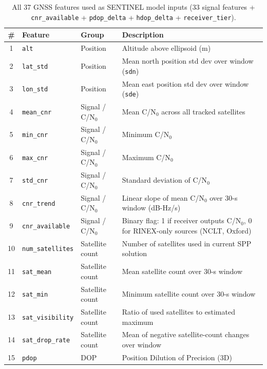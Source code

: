 \documentclass[12pt,a4paper]{article}
\newcommand{\code}[1]{\texttt{#1}}
\begin{document}
\begin{longtable}{cllp{4.5cm}}
  \caption{All 37 GNSS features used as SENTINEL model inputs (33 signal features + \code{cnr\_available} + \code{pdop\_delta} + \code{hdop\_delta} + \code{receiver\_tier}).} \\
  \toprule
  \textbf{\#} & \textbf{Feature} & \textbf{Group} & \textbf{Description} \\
  \midrule
  \endhead
  1  & \code{alt}                   & Position              & Altitude above ellipsoid (m) \\
  2  & \code{lat\_std}              & Position              & Mean north position std dev over window (\code{sdn}) \\
  3  & \code{lon\_std}              & Position              & Mean east position std dev over window (\code{sde}) \\
  4  & \code{mean\_cnr}             & Signal / C/N$_0$      & Mean C/N$_0$ across all tracked satellites \\
  5  & \code{min\_cnr}              & Signal / C/N$_0$      & Minimum C/N$_0$ \\
  6  & \code{max\_cnr}              & Signal / C/N$_0$      & Maximum C/N$_0$ \\
  7  & \code{std\_cnr}              & Signal / C/N$_0$      & Standard deviation of C/N$_0$ \\
  8  & \code{cnr\_trend}            & Signal / C/N$_0$      & Linear slope of mean C/N$_0$ over 30-s window (dB-Hz/s) \\
  9  & \code{cnr\_available}        & Signal / C/N$_0$      & Binary flag: 1 if receiver outputs C/N$_0$, 0 for RINEX-only sources (NCLT, Oxford) \\
  10 & \code{num\_satellites}       & Satellite count       & Number of satellites used in current SPP solution \\
  11 & \code{sat\_mean}             & Satellite count       & Mean satellite count over 30-s window \\
  12 & \code{sat\_min}              & Satellite count       & Minimum satellite count over 30-s window \\
  13 & \code{sat\_visibility}       & Satellite count       & Ratio of used satellites to estimated maximum \\
  14 & \code{sat\_drop\_rate}       & Satellite count       & Mean of negative satellite-count changes over window \\
  15 & \code{pdop}                  & DOP                   & Position Dilution of Precision (3D) \\

\end{longtable}
\end{document}
